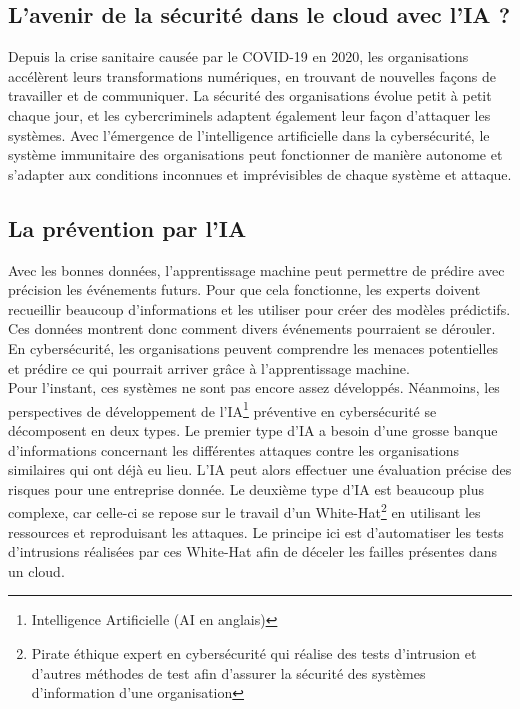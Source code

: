 \documentclass[a4paper, 12pt]{article}
\begin{document}
\begin{spacing}{1.1}
  \section{L'avenir de la sécurité dans le cloud avec l'IA ?}
    Depuis la crise sanitaire causée par le COVID-19 en 2020, les organisations
    accélèrent leurs transformations numériques, en trouvant de nouvelles façons
    de travailler et de communiquer. La sécurité des organisations évolue petit
    à petit chaque jour, et les cybercriminels adaptent également leur façon
    d'attaquer les systèmes. Avec l’émergence de l'intelligence artificielle
    dans la cybersécurité, le système immunitaire des organisations peut
    fonctionner de manière autonome et s'adapter aux conditions inconnues et
    imprévisibles de chaque système et attaque.

    \subsection{La prévention par l'IA}
      Avec les bonnes données, l'apprentissage machine peut permettre de prédire
      avec précision les événements futurs. Pour que cela fonctionne, les
      experts doivent recueillir beaucoup d'informations et les utiliser pour
      créer des modèles prédictifs. Ces données montrent donc comment divers
      événements pourraient se dérouler. En cybersécurité, les organisations
      peuvent comprendre les menaces potentielles et prédire ce qui pourrait
      arriver grâce à l'apprentissage machine. \\

      Pour l’instant, ces systèmes ne sont pas encore assez développés.
      Néanmoins, les perspectives de développement de l’IA\footnote{Intelligence
      Artificielle (AI en anglais)} préventive en cybersécurité se décomposent
      en deux types. Le premier type d'IA a besoin d’une grosse banque
      d'informations concernant les différentes attaques contre les
      organisations similaires qui ont déjà eu lieu. L'IA peut alors effectuer
      une évaluation précise des risques pour une entreprise donnée. Le deuxième
      type d’IA est beaucoup plus complexe, car celle-ci se repose sur le
      travail d’un White-Hat\footnote{Pirate éthique expert en cybersécurité qui
      réalise des tests d'intrusion et d'autres méthodes de test afin d'assurer
      la sécurité des systèmes d'information d'une organisation} en utilisant
      les ressources et reproduisant les attaques. Le principe ici est
      d’automatiser les tests d’intrusions réalisées par ces White-Hat afin de
      déceler les failles présentes dans un cloud.


\end{spacing}
\end{document}
